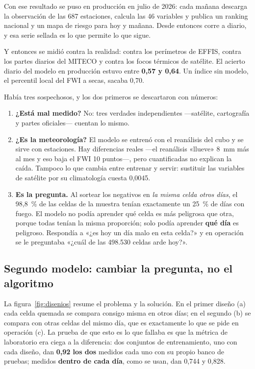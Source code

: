 \documentclass[11pt,a4paper]{article}
\begin{document}
Con ese resultado se puso en producción en julio de 2026: cada mañana descarga
la observación de las 687 estaciones, calcula las 46 variables y publica un
ranking nacional y un mapa de riesgo para hoy y mañana. Desde entonces corre a
diario, y esa serie sellada es lo que permite lo que sigue.

Y entonces se midió contra la realidad: contra los perímetros de EFFIS, contra
los partes diarios del MITECO y contra los focos térmicos de satélite. El
acierto diario del modelo en producción estuvo entre \textbf{0,57 y 0,64}. Un
índice sin modelo, el percentil local del FWI a secas, sacaba 0,70.

Había tres sospechosos, y los dos primeros se descartaron con números:

\begin{enumerate}
  \item \textbf{¿Está mal medido?} No: tres verdades independientes
  ---satélite, cartografía y partes oficiales--- cuentan lo mismo.
  \item \textbf{¿Es la meteorología?} El modelo se entrenó con el reanálisis
  del cubo y se sirve con estaciones. Hay diferencias reales ---el reanálisis
  «llueve» 8~mm más al mes y eso baja el FWI 10 puntos---, pero cuantificadas
  no explican la caída. Tampoco lo que cambia entre entrenar y servir:
  sustituir las variables de satélite por su climatología cuesta 0,0045.
  \item \textbf{Es la pregunta.} Al sortear los negativos en \emph{la misma
  celda otros días}, el 98,8~\% de las celdas de la muestra tenían
  exactamente un 25~\% de días con fuego. El modelo no podía aprender
  qué celda es más peligrosa que otra, porque todas tenían la misma
  proporción; solo podía aprender \textbf{qué día} es peligroso. Respondía a
  «¿es hoy un día malo en esta celda?» y en operación se le preguntaba «¿cuál
  de las 498.530 celdas arde hoy?».
\end{enumerate}

\subsection{Segundo modelo: cambiar la pregunta, no el algoritmo}

La figura~\ref{fig:disenios} resume el problema y la solución. En el primer
diseño (a) cada celda quemada se compara consigo misma en otros días; en el
segundo (b) se compara con otras celdas del mismo día, que es exactamente lo
que se pide en operación (c). La prueba de que esto es lo que fallaba es que
la métrica de laboratorio era ciega a la diferencia: dos conjuntos de
entrenamiento, uno con cada diseño, dan \textbf{0,92 los dos} medidos cada uno
con su propio banco de pruebas; medidos \textbf{dentro de cada día}, como se
usan, dan 0,744 y 0,828.
\end{document}
